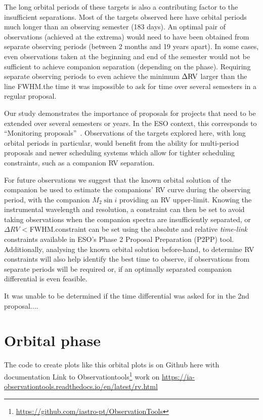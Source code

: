 The long orbital periods of these targets is also a contributing factor to the insufficient separations. Most of the targets observed here have orbital periods much longer than an observing semester (183 days). An optimal pair of observations (achieved at the extrema) would need to have been obtained from separate observing periods (between 2 months and 19 years apart). In some cases, even observations taken at the beginning and end of the semester would not be sufficient to achieve companion separation (depending on the phase). Requiring separate observing periods to even achieve the minimum \(\Delta \rm {RV}\) larger than the line {FWHM}.\@At the time it was impossible to ask for time over several semesters in a regular proposal.

Our study demonstrates the importance of proposals for projects that need to be extended over several semesters or years. In the ESO context, this corresponds to ``Monitoring proposals''~\citep[e.g.,][pg. 18]{eso_eso_2017}. Observations of the targets explored here, with long orbital periods in particular, would benefit from the ability for multi-period proposals and newer scheduling systems which allow for tighter scheduling constraints, such as a companion {RV} separation.

For future observations we suggest that the known orbital solution of the companion be used to estimate the companions' {RV} curve during the observing period, with the companion \(M_2\sin{i}\) providing an {RV} upper-limit. Knowing the instrumental wavelength and resolution, a constraint can then be set to avoid taking observations when the companion spectra are insufficiently separated, or \(\Delta {RV}\) < {FWHM}.\@This constraint can be set using the absolute and relative \emph{time-link} constraints available in ESO's Phase 2 Proposal Preparation (P2PP) tool.
Additionally, analysing the known orbital solution before-hand, to determine {RV} constraints will also help identify the best time to observe, if observations from separate periods will be required or, if an optimally separated companion differential is even feasible.


It was unable to be determined if the time differential was asked for in the 2nd proposal.... 


\section{Orbital phase}


The code to create plots like this orbital plots  is on Github here with documentation Link to Observationtools\footnote{\href{https://github.com/iastro-pt/ObservationTools}{https://github.com/iastro-pt/ObservationTools}} work on \href{Read the Docs}{https://ia-observationtools.readthedocs.io/en/latest/rv.html}



